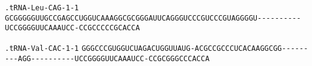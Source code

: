 \documentclass{article}
\newcommand{\rnabox}[1]{\colorbox{#1}{\texttt{#1}}}
\begin{document}
\vspace{-0.5mm}

\texttt{.tRNA-Leu-CAG-1-1}
\rnabox{G}\rnabox{C}\rnabox{G}\rnabox{G}\rnabox{G}\rnabox{G}\rnabox{G}\rnabox{U}\rnabox{U}\rnabox{G}\rnabox{C}\rnabox{C}\rnabox{G}\rnabox{A}\rnabox{G}\rnabox{C}\rnabox{C}\rnabox{U}\rnabox{G}\rnabox{G}\rnabox{U}\rnabox{C}\rnabox{A}\rnabox{A}\rnabox{A}\rnabox{G}\rnabox{G}\rnabox{C}\rnabox{G}\rnabox{C}\rnabox{G}\rnabox{G}\rnabox{G}\rnabox{A}\rnabox{U}\rnabox{U}\rnabox{C}\rnabox{A}\rnabox{G}\rnabox{G}\rnabox{G}\rnabox{U}\rnabox{C}\rnabox{C}\rnabox{C}\rnabox{G}\rnabox{U}\rnabox{C}\rnabox{C}\rnabox{C}\rnabox{G}\rnabox{U}\rnabox{A}\rnabox{G}\rnabox{G}\rnabox{G}\rnabox{G}\rnabox{U}\rnabox{-}\rnabox{-}\rnabox{-}\rnabox{-}\rnabox{-}\rnabox{-}\rnabox{-}\rnabox{-}\rnabox{-}\rnabox{-}\rnabox{U}\rnabox{C}\rnabox{C}\rnabox{G}\rnabox{G}\rnabox{G}\rnabox{G}\rnabox{U}\rnabox{U}\rnabox{C}\rnabox{A}\rnabox{A}\rnabox{A}\rnabox{U}\rnabox{C}\rnabox{C}\rnabox{-}\rnabox{C}\rnabox{C}\rnabox{G}\rnabox{C}\rnabox{C}\rnabox{C}\rnabox{C}\rnabox{C}\rnabox{G}\rnabox{C}\rnabox{A}\rnabox{C}\rnabox{C}\rnabox{A}

\vspace{-0.5mm}

\texttt{.tRNA-Val-CAC-1-1}
\rnabox{G}\rnabox{G}\rnabox{G}\rnabox{C}\rnabox{C}\rnabox{C}\rnabox{G}\rnabox{U}\rnabox{G}\rnabox{G}\rnabox{U}\rnabox{C}\rnabox{U}\rnabox{A}\rnabox{G}\rnabox{A}\rnabox{C}\rnabox{U}\rnabox{G}\rnabox{G}\rnabox{U}\rnabox{U}\rnabox{A}\rnabox{U}\rnabox{G}\rnabox{-}\rnabox{A}\rnabox{C}\rnabox{G}\rnabox{C}\rnabox{C}\rnabox{G}\rnabox{C}\rnabox{C}\rnabox{C}\rnabox{U}\rnabox{C}\rnabox{A}\rnabox{C}\rnabox{A}\rnabox{A}\rnabox{G}\rnabox{G}\rnabox{C}\rnabox{G}\rnabox{G}\rnabox{-}\rnabox{-}\rnabox{-}\rnabox{-}\rnabox{-}\rnabox{-}\rnabox{-}\rnabox{-}\rnabox{-}\rnabox{A}\rnabox{G}\rnabox{G}\rnabox{-}\rnabox{-}\rnabox{-}\rnabox{-}\rnabox{-}\rnabox{-}\rnabox{-}\rnabox{-}\rnabox{-}\rnabox{-}\rnabox{U}\rnabox{C}\rnabox{C}\rnabox{G}\rnabox{G}\rnabox{G}\rnabox{G}\rnabox{U}\rnabox{U}\rnabox{C}\rnabox{A}\rnabox{A}\rnabox{A}\rnabox{U}\rnabox{C}\rnabox{C}\rnabox{-}\rnabox{C}\rnabox{C}\rnabox{G}\rnabox{C}\rnabox{G}\rnabox{G}\rnabox{G}\rnabox{C}\rnabox{C}\rnabox{C}\rnabox{A}\rnabox{C}\rnabox{C}\rnabox{A}

\vspace{-0.5mm}
\end{document}
